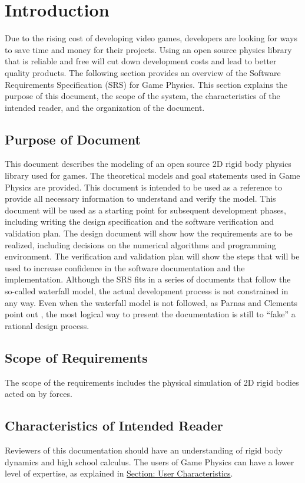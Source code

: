\documentclass[12pt]{article}
\begin{document}
\section{Introduction}
\label{Sec:Intro}
Due to the rising cost of developing video games, developers are looking for ways to save time and money for their projects. Using an open source physics library that is reliable and free will cut down development costs and lead to better quality products.
The following section provides an overview of the Software Requirements Specification (SRS) for Game Physics. This section explains the purpose of this document, the scope of the system, the characteristics of the intended reader, and the organization of the document.
\subsection{Purpose of Document}
\label{Sec:DocPurpose}
This document describes the modeling of an open source 2D rigid body physics library used for games. The theoretical models and goal statements used in Game Physics are provided. This document is intended to be used as a reference to provide all necessary information to understand and verify the model.
This document will be used as a starting point for subsequent development phases, including writing the design specification and the software verification and validation plan. The design document will show how the requirements are to be realized, including decisions on the numerical algorithms and programming environment. The verification and validation plan will show the steps that will be used to increase confidence in the software documentation and the implementation. Although the SRS fits in a series of documents that follow the so-called waterfall model, the actual development process is not constrained in any way. Even when the waterfall model is not followed, as Parnas and Clements point out \cite{parnasClements1986}, the most logical way to present the documentation is still to ``fake'' a rational design process.
\subsection{Scope of Requirements}
\label{Sec:ReqsScope}
The scope of the requirements includes the physical simulation of 2D rigid bodies acted on by forces.
\subsection{Characteristics of Intended Reader}
\label{Sec:ReaderChars}
Reviewers of this documentation should have an understanding of rigid body dynamics and high school calculus. The users of Game Physics can have a lower level of expertise, as explained in \hyperref[Sec:UserChars]{Section: User Characteristics}.
\end{document}
